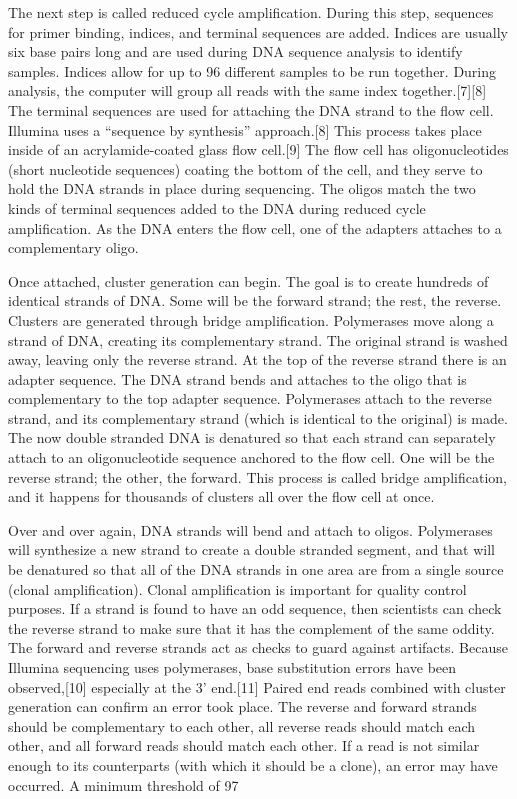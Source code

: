 The next step is called reduced cycle amplification. During this step, sequences for primer binding, indices, and terminal sequences are added. Indices are usually six base pairs long and are used during DNA sequence analysis to identify samples. Indices allow for up to 96 different samples to be run together. During analysis, the computer will group all reads with the same index together.[7][8] The terminal sequences are used for attaching the DNA strand to the flow cell. Illumina uses a “sequence by synthesis” approach.[8] This process takes place inside of an acrylamide-coated glass flow cell.[9] The flow cell has oligonucleotides (short nucleotide sequences) coating the bottom of the cell, and they serve to hold the DNA strands in place during sequencing. The oligos match the two kinds of terminal sequences added to the DNA during reduced cycle amplification. As the DNA enters the flow cell, one of the adapters attaches to a complementary oligo.

Once attached, cluster generation can begin. The goal is to create hundreds of identical strands of DNA. Some will be the forward strand; the rest, the reverse. Clusters are generated through bridge amplification. Polymerases move along a strand of DNA, creating its complementary strand. The original strand is washed away, leaving only the reverse strand. At the top of the reverse strand there is an adapter sequence. The DNA strand bends and attaches to the oligo that is complementary to the top adapter sequence. Polymerases attach to the reverse strand, and its complementary strand (which is identical to the original) is made. The now double stranded DNA is denatured so that each strand can separately attach to an oligonucleotide sequence anchored to the flow cell. One will be the reverse strand; the other, the forward. This process is called bridge amplification, and it happens for thousands of clusters all over the flow cell at once.

Over and over again, DNA strands will bend and attach to oligos. Polymerases will synthesize a new strand to create a double stranded segment, and that will be denatured so that all of the DNA strands in one area are from a single source (clonal amplification). Clonal amplification is important for quality control purposes. If a strand is found to have an odd sequence, then scientists can check the reverse strand to make sure that it has the complement of the same oddity. The forward and reverse strands act as checks to guard against artifacts. Because Illumina sequencing uses polymerases, base substitution errors have been observed,[10] especially at the 3’ end.[11] Paired end reads combined with cluster generation can confirm an error took place. The reverse and forward strands should be complementary to each other, all reverse reads should match each other, and all forward reads should match each other. If a read is not similar enough to its counterparts (with which it should be a clone), an error may have occurred. A minimum threshold of 97%

